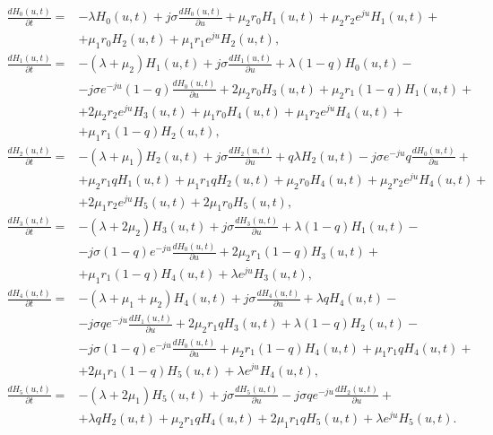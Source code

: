 \begin{align*} 
	\frac{dH_{0}(u,t)}{\partial t}=&-\lambda H_{0}(u,t)+j\sigma \frac{dH_{0}(u,t)}{\partial u}+\mu_{2}r_{0}H_{1}(u,t)+\mu_{2}r_{2}e^{ju}H_{1}(u,t)+\\
	&+\mu_{1}r_{0}H_{2}(u,t)+\mu_{1}r_{1}e^{ju}H_{2}(u,t),\\
	\frac{dH_{1}(u,t)}{\partial t}=&-(\lambda+\mu_{2}) H_{1}(u,t)+j\sigma \frac{dH_{1}(u,t)}{\partial u}+\lambda(1-q)H_{0}(u,t)-\\
	&-j\sigma e^{-ju}(1-q) \frac{dH_{0}(u,t)}{\partial u}+2\mu_{2}r_{0}H_{3}(u,t)+\mu_{2}r_{1}(1-q)H_{1}(u,t)+\\
	&+2\mu_{2}r_{2}e^{ju}H_{3}(u,t)+\mu_{1}r_{0}H_{4}(u,t)+\mu_{1}r_{2}e^{ju}H_{4}(u,t)+\\
	&+\mu_{1}r_{1}(1-q)H_{2}(u,t),\\
	\frac{dH_{2}(u,t)}{\partial t}=&-(\lambda+\mu_{1}) H_{2}(u,t)+j\sigma \frac{dH_{2}(u,t)}{\partial u}+q\lambda  H_{2}(u,t)-j\sigma e^{-ju}q \frac{dH_{0}(u,t)}{\partial u}+\\
	&+\mu_{2}r_{1}qH_{1}(u,t)+\mu_{1}r_{1}qH_{2}(u,t)+\mu_{2}r_{0}H_{4}(u,t)+\mu_{2}r_{2}e^{ju}H_{4}(u,t)+\\
	&+2\mu_{1}r_{2}e^{ju}H_{5}(u,t)+2\mu_{1}r_{0}H_{5}(u,t),\\
	\frac{dH_{3}(u,t)}{\partial t}=&-(\lambda+2\mu_{2}) H_{3}(u,t)+j\sigma \frac{dH_{3}(u,t)}{\partial u}+\lambda(1-q) H_{1}(u,t)-\\
	&-j\sigma (1-q)e^{-ju} \frac{dH_{0}(u,t)}{\partial u}+2\mu_{2}r_{1}(1-q) H_{3}(u,t)+\\
	&+\mu_{1}r_{1}(1-q) H_{4}(u,t)+\lambda e^{ju} H_{3}(u,t),\\
	\frac{dH_{4}(u,t)}{\partial t}=&-(\lambda+\mu_{1}+\mu_{2}) H_{4}(u,t)+j\sigma \frac{dH_{4}(u,t)}{\partial u}+\lambda qH_{4}(u,t)-\\
	&-j\sigma qe^{-ju} \frac{dH_{1}(u,t)}{\partial u}+2\mu_{2}r_{1}qH_{3}(u,t)+\lambda(1-q)H_{2}(u,t)-\\
	&-j\sigma (1-q)e^{-ju} \frac{dH_{0}(u,t)}{\partial u}+\mu_{2}r_{1}(1-q)H_{4}(u,t)+\mu_{1}r_{1}qH_{4}(u,t)+\\
	&+2\mu_{1}r_{1}(1-q)H_{5}(u,t)+\lambda e^{ju}H_{4}(u,t),\\
	\frac{dH_{5}(u,t)}{\partial t}=&-(\lambda+2\mu_{1}) H_{5}(u,t)+j\sigma \frac{dH_{5}(u,t)}{\partial u}-j\sigma qe^{-ju} \frac{dH_{2}(u,t)}{\partial u}+\\
	&+\lambda qH_{2}(u,t)+\mu_{2}r_{1}qH_{4}(u,t)+2\mu_{1}r_{1}qH_{5}(u,t)+\lambda e^{ju}H_{5}(u,t).\\
\end{align*} 
